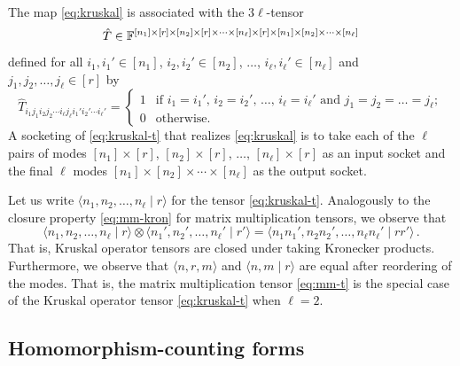 \documentclass[11pt]{article}
\numberwithin{equation}{section}
\theoremstyle{definition}
\theoremstyle{plain}
\newcommand{\bra}{\ensuremath{\langle}}
\newcommand{\ket}{\ensuremath{\rangle}}
\newcommand{\F}{\ensuremath{\mathbb{F}}}
\begin{document}
The map \eqref{eq:kruskal} is associated with the $3\ell$-tensor
\[
\hat{T}\in\F^{%
[n_1]\times [r]\times
[n_2]\times [r]\times
\cdots \times
[n_\ell]\times [r]\times
[n_1]\times [n_2]\times\cdots\times [n_\ell]}
\]
defined for all
$i_1,i_1'\in [n_1]$,
$i_2,i_2'\in [n_2]$,
$\ldots$,
$i_\ell,i_\ell'\in [n_\ell]$
and
$j_1,j_2,\ldots,j_\ell\in [r]$
by
\begin{equation}
\label{eq:kruskal-t}
\hat{T}_{i_1j_1i_2j_2\cdots i_\ell j_\ell i_1'i_2'\cdots i_\ell'}=
\begin{cases}
1 & \text{if $i_1=i_1'$, $i_2=i_2'$, $\ldots$, $i_\ell=i_\ell'$ and $j_1=j_2=\ldots=j_\ell$};\\
0 & \text{otherwise}.
\end{cases}
\end{equation}
A socketing of \eqref{eq:kruskal-t} that realizes \eqref{eq:kruskal}
is to take each of the $\ell$ pairs of modes
$[n_1]\times[r]$, $[n_2]\times[r]$, $\ldots$, $[n_\ell]\times [r]$
as an input socket and the final $\ell$ modes
$[n_1]\times [n_2]\times\cdots\times[n_\ell]$ as the output socket.

%
%
Let us write $\bra n_1,n_2,\ldots,n_\ell \mid r\ket$ for the tensor
%
\eqref{eq:kruskal-t}. Analogously to the closure property \eqref{eq:mm-kron}
for matrix multiplication tensors, we observe that
\begin{equation}
\label{eq:kruskal-kron}
%
%
%
\bra n_1,n_2,\ldots,n_\ell\mid r\ket
\otimes
%
%
\bra n_1',n_2',\ldots,n_\ell' \mid r'\ket
%
=
%
%
\bra n_1n_1',n_2n_2',\ldots,n_\ell n_\ell' \mid rr'\ket\,.
%
\end{equation}
That is, Kruskal operator tensors are closed under taking Kronecker products.
Furthermore, we observe that $\bra n,r,m\ket$ and %
%
$\bra n,m \mid r\ket$ are equal after
%
 reordering of the modes. That is, the
matrix multiplication tensor \eqref{eq:mm-t} is the special case
of the Kruskal operator tensor \eqref{eq:kruskal-t} when $\ell=2$.


\subsection{Homomorphism-counting forms}

\label{sect:binom}
\end{document}

